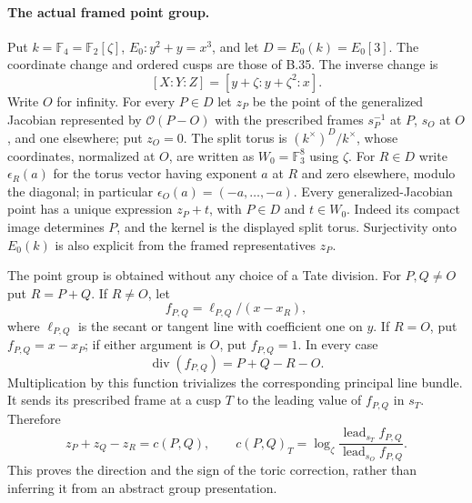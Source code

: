 
\paragraph{The actual framed point group.}
Put $k=\mathbb F_4=\mathbb F_2[\zeta]$,
$E_0:y^2+y=x^3$, and let $D=E_0(k)=E_0[3]$.
The coordinate change and ordered cusps are those of B.35.
The inverse change is
\[
                  [X:Y:Z]=[y+\zeta:y+\zeta^2:x].
\]
Write $O$ for infinity.  For every $P\in D$ let $z_P$
be the point of the generalized Jacobian represented by
$\mathcal O(P-O)$ with the prescribed frames
$s_P^{-1}$ at $P$, $s_O$ at $O$, and one elsewhere;
put $z_O=0$.
The split torus is $(k^\times)^D/k^\times$, whose
coordinates, normalized at $O$, are written as
$W_0=\mathbb F_3^8$ using $\zeta$.
For $R\in D$ write $\epsilon_R(a)$ for the torus vector
having exponent $a$ at $R$ and zero elsewhere, modulo
the diagonal; in particular
$\epsilon_O(a)=(-a,\ldots,-a)$.
Every generalized-Jacobian point has a unique expression
$z_P+t$, with $P\in D$ and $t\in W_0$.
Indeed its compact image determines $P$, and the kernel
is the displayed split torus.  Surjectivity onto $E_0(k)$
is also explicit from the framed representatives $z_P$.

The point group is obtained without any choice of a
Tate division.  For $P,Q\ne O$ put $R=P+Q$.
If $R\ne O$, let
\[
 f_{P,Q}=\ell_{P,Q}/(x-x_R),
\]
where $\ell_{P,Q}$ is the secant or tangent line with
coefficient one on $y$.
If $R=O$, put $f_{P,Q}=x-x_P$; if either argument is
$O$, put $f_{P,Q}=1$.
In every case
\[
          \operatorname{div}(f_{P,Q})=P+Q-R-O.
\]
Multiplication by this function trivializes the
corresponding principal line bundle.  It sends its
prescribed frame at a cusp $T$ to the leading value
of $f_{P,Q}$ in $s_T$.  Therefore
\[
 z_P+z_Q-z_R=c(P,Q),\qquad
 c(P,Q)_T=
 \log_\zeta\frac{\operatorname{lead}_{s_T}f_{P,Q}}
                         {\operatorname{lead}_{s_O}f_{P,Q}}.
                                                               \tag{TP.1}
\]
This proves the direction and the sign of the toric
correction, rather than inferring it from an abstract
group presentation.

